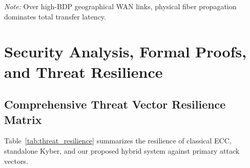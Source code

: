 \documentclass[sn-mathphys,Numbered]{sn-jnl}%
\theoremstyle{thmstyleone}%
\theoremstyle{thmstyletwo}%
\theoremstyle{thmstylethree}%
\begin{document}
\begin{table}[!htbp]
\centering
\caption{Multi-region geographical cloud latency and throughput under inter-continental WAN links.}
\label{tab:wan_benchmarks}
\vspace{0.3em}
\raggedright\small\textit{Note:} Over high-BDP geographical WAN links, physical fiber propagation dominates total transfer latency.
\end{table}

\section{Security Analysis, Formal Proofs, and Threat Resilience}\label{sec:security}

\subsection{\textbf{Comprehensive Threat Vector Resilience Matrix}}
Table~\ref{tab:threat_resilience} summarizes the resilience of classical ECC, standalone Kyber, and our proposed hybrid system against primary attack vectors.
\end{document}
